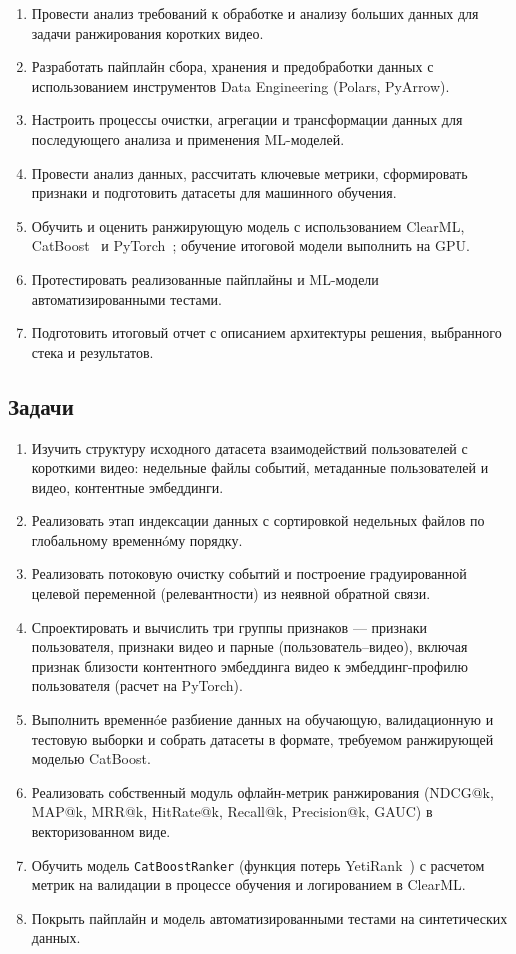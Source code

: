 \begin{enumerate}
    \item Провести анализ требований к обработке и анализу больших данных для задачи ранжирования коротких видео.
    \item Разработать пайплайн сбора, хранения и предобработки данных с использованием инструментов Data Engineering (Polars, PyArrow).
    \item Настроить процессы очистки, агрегации и трансформации данных для последующего анализа и применения ML-моделей.
    \item Провести анализ данных, рассчитать ключевые метрики, сформировать признаки и подготовить датасеты для машинного обучения.
    \item Обучить и оценить ранжирующую модель с использованием ClearML, CatBoost~\cite{catboost-docs} и PyTorch~\cite{pytorch-docs}; обучение итоговой модели выполнить на GPU.
    \item Протестировать реализованные пайплайны и ML-модели автоматизированными тестами.
    \item Подготовить итоговый отчет с описанием архитектуры решения, выбранного стека и результатов.
\end{enumerate}

\subsection{Задачи}

\begin{enumerate}
    \item Изучить структуру исходного датасета взаимодействий пользователей с короткими видео: недельные файлы событий, метаданные пользователей и видео, контентные эмбеддинги.
    \item Реализовать этап индексации данных с сортировкой недельных файлов по глобальному временнóму порядку.
    \item Реализовать потоковую очистку событий и построение градуированной целевой переменной (релевантности) из неявной обратной связи.
    \item Спроектировать и вычислить три группы признаков --- признаки пользователя, признаки видео и парные (пользователь--видео), включая признак близости контентного эмбеддинга видео к эмбеддинг-профилю пользователя (расчет на PyTorch).
    \item Выполнить временнóе разбиение данных на обучающую, валидационную и тестовую выборки и собрать датасеты в формате, требуемом ранжирующей моделью CatBoost.
    \item Реализовать собственный модуль офлайн-метрик ранжирования (NDCG@k, MAP@k, MRR@k, HitRate@k, Recall@k, Precision@k, GAUC) в векторизованном виде.
    \item Обучить модель \texttt{CatBoostRanker} (функция потерь YetiRank~\cite{yetirank}) с расчетом метрик на валидации в процессе обучения и логированием в ClearML.
    \item Покрыть пайплайн и модель автоматизированными тестами на синтетических данных.
\end{enumerate}

